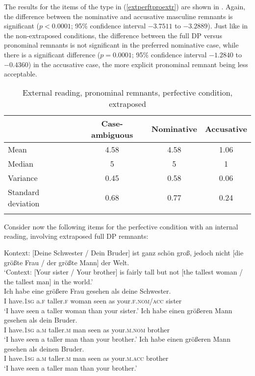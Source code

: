 The results for the items of the type in (\ref{extperftproextr}) are shown in .
Again, the difference between the nominative and accusative masculine remnants is significant ($p<0.0001$; 95\% confidence interval $-3.7511$ to $-3.2889$). Just like in the non-extraposed conditions, the difference between the full DP versus pronominal remnants is not significant in the preferred nominative case, while there is a significant difference ($p=0.0001$; 95\% confidence interval $-1.2840$ to $-0.4360$) in the accusative case, the more explicit pronominal remnant being less acceptable.

\begin{table}
\begin{tabular}{l *3{S[table-format=1.2]}}
\lsptoprule
{} & {Case-ambiguous} & {Nominative} & {Accusative}\\
\midrule
Mean & 4.58 & 4.58 & 1.06\\
Median & 5 & 5 & 1\\
Variance & 0.45 & 0.58 & 0.06\\
Standard deviation & 0.68 & 0.77 & 0.24\\
\lspbottomrule
\end{tabular}
\caption{External reading, pronominal remnants, perfective condition, extraposed}
\label{tableextperftproextr}
\end{table} 


Consider now the following items for the perfective condition with an internal reading, involving extraposed full DP remnants:

\ea Kontext: [Deine Schwester / Dein Bruder] ist ganz schön groß, jedoch nicht [die größte Frau / der größte Mann] der Welt. \label{intperftfullextr}\\
`Context: [Your sister / Your brother] is fairly tall but not [the tallest woman / the tallest man] in the world.'\\
\ea \gll Ich habe eine größere Frau gesehen als deine Schwester. \label{intperftfullextrambig}\\
I have.\textsc{1sg} a.\textsc{f} taller.\textsc{f} woman seen as your.\textsc{f.nom/acc} sister\\
\glt `I have seen a taller woman than your sister.'
\ex \gll Ich habe einen größeren Mann gesehen als dein Bruder. \label{intperftfullextrnom}\\
I have.\textsc{1sg} a.\textsc{m} taller.\textsc{m} man seen as your.\textsc{m.nom} brother\\
\glt `I have seen a taller man than your brother.'
\ex \gll Ich habe einen größeren Mann gesehen als deinen Bruder. \label{intperftfullextracc}\\
I have.\textsc{1sg} a.\textsc{m} taller.\textsc{m} man seen as your.\textsc{m.acc} brother\\
\glt `I have seen a taller man than your brother.'
\z
\z

